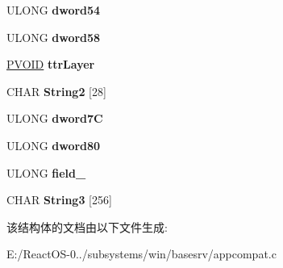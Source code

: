 \begin{DoxyCompactItemize}
U\+L\+O\+NG {\bfseries dword54}
\item 
\mbox{\label{struct___b_a_s_e___a_p_p___c_o_m_p_a_t___e_x_t_r_a1_a8628d245dee5e8e01e33df9ee18350e3}} 
U\+L\+O\+NG {\bfseries dword58}
\item 
\mbox{\label{struct___b_a_s_e___a_p_p___c_o_m_p_a_t___e_x_t_r_a1_a45cb44edf6db9ecf013ab7a8ff965b0d}} 
\hyperlink{interfacevoid}{P\+V\+O\+ID} {\bfseries ttr\+Layer}
\item 
\mbox{\label{struct___b_a_s_e___a_p_p___c_o_m_p_a_t___e_x_t_r_a1_af608206adc3bd90c00a468da2adfd22f}} 
C\+H\+AR {\bfseries String2} \mbox{[}28\mbox{]}
\item 
\mbox{\label{struct___b_a_s_e___a_p_p___c_o_m_p_a_t___e_x_t_r_a1_a16450156367de9f587130472de2258d2}} 
U\+L\+O\+NG {\bfseries dword7C}
\item 
\mbox{\label{struct___b_a_s_e___a_p_p___c_o_m_p_a_t___e_x_t_r_a1_a2291f04d5e007e770551bb7d74ee2642}} 
U\+L\+O\+NG {\bfseries dword80}
\item 
\mbox{\label{struct___b_a_s_e___a_p_p___c_o_m_p_a_t___e_x_t_r_a1_ac8dbe85440b151c354ce397b03e1840a}} 
U\+L\+O\+NG {\bfseries field\+\_}
\item 
\mbox{\label{struct___b_a_s_e___a_p_p___c_o_m_p_a_t___e_x_t_r_a1_a8874a5feb5969cbec31d28f958e654cc}} 
C\+H\+AR {\bfseries String3} \mbox{[}256\mbox{]}
\end{DoxyCompactItemize}


该结构体的文档由以下文件生成\+:\begin{DoxyCompactItemize}
\item 
E\+:/\+React\+O\+S-\/0../subsystems/win/basesrv/appcompat.\+c\end{DoxyCompactItemize}
